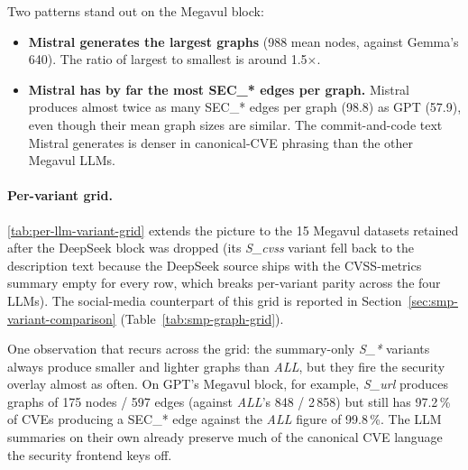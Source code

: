 \documentclass[11pt,a4paper]{article}
\begin{document}
Two patterns stand out on the Megavul block:

\begin{itemize}[leftmargin=*, itemsep=0pt]
    \item \textbf{Mistral generates the largest graphs} (988
    mean nodes, against Gemma's 640). The ratio of largest
    to smallest is around 1.5$\times$.
    \item \textbf{Mistral has by far the most SEC\_* edges
    per graph.} Mistral produces almost twice as many
    SEC\_* edges per graph (98.8) as GPT (57.9), even
    though their mean graph sizes are similar. The
    commit-and-code text Mistral generates is denser in
    canonical-CVE phrasing than the other Megavul LLMs.
\end{itemize}

\paragraph{Per-variant grid.}
\autoref{tab:per-llm-variant-grid} extends the picture to
the 15 Megavul datasets retained after the DeepSeek block
was dropped (its \emph{S\_cvss} variant fell back to the
description text because the DeepSeek source ships with
the CVSS-metrics summary empty for every row, which
breaks per-variant parity across the four LLMs). The
social-media counterpart of this grid is reported in
Section~\ref{sec:smp-variant-comparison}
(Table~\ref{tab:smp-graph-grid}).

One observation that recurs across the grid: the
summary-only \emph{S\_*} variants always produce smaller
and lighter graphs than \emph{ALL}, but they fire the
security overlay almost as often. On GPT's Megavul block,
for example, \emph{S\_url} produces graphs of 175 nodes /
597 edges (against \emph{ALL}'s 848 / 2\,858) but still has
97.2\,\% of CVEs producing a SEC\_* edge against the
\emph{ALL} figure of 99.8\,\%. The LLM summaries on their
own already preserve much of the canonical CVE language
the security frontend keys off.
\end{document}
